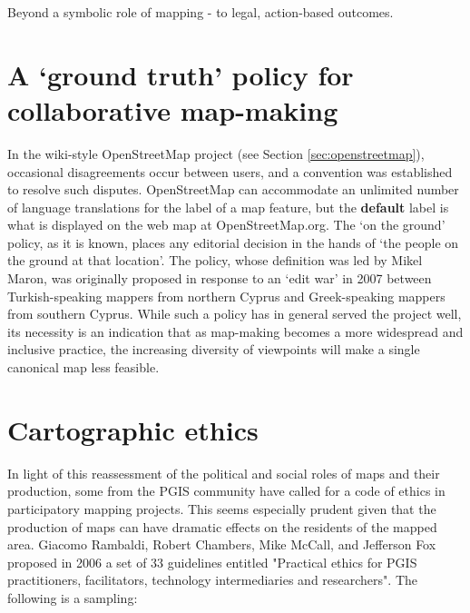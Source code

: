 \documentclass[11pt]{report}
\begin{document}


Beyond a symbolic role of mapping - to legal, action-based outcomes.

\section{A `ground truth' policy for collaborative map-making}

In the wiki-style OpenStreetMap project (see Section \ref{sec:openstreetmap}), occasional disagreements occur between users, and a convention was established to resolve such disputes. OpenStreetMap can accommodate an unlimited number of language translations for the label of a map feature, but the \textbf{default} label is what is displayed on the web map at OpenStreetMap.org. The `on the ground' policy, as it is known, places any editorial decision in the hands of `the people on the ground at that location'. The policy, whose definition was led by Mikel Maron, was originally proposed in response to an `edit war' in 2007 between Turkish-speaking mappers from northern Cyprus and Greek-speaking mappers from southern Cyprus.\cite{osm2007disputes} While such a policy has in general served the project well, its necessity is an indication that as map-making becomes a more widespread and inclusive practice, the increasing diversity of viewpoints will make a single canonical map less feasible. 

\section{Cartographic ethics}
\label{sec:ethics}

In light of this reassessment of the political and social roles of maps and their production, some from the PGIS community have called for a code of ethics in participatory mapping projects. This seems especially prudent given that the production of maps can have dramatic effects on the residents of the mapped area. Giacomo Rambaldi, Robert Chambers, Mike McCall, and Jefferson Fox proposed in 2006 a set of 33 guidelines entitled "Practical ethics for PGIS practitioners, facilitators, technology intermediaries and researchers". The following is a sampling:
\end{document}
